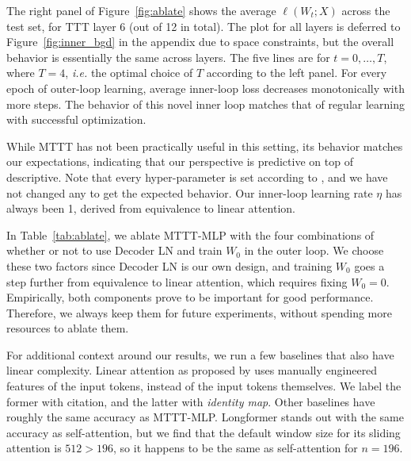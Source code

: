 \documentclass{article} %
\begin{document}
The right panel of Figure~\ref{fig:ablate} shows the average $\ell(W_t; X)$ across the test set, for TTT layer 6 (out of 12 in total).
The plot for all layers is deferred to Figure~\ref{fig:inner_bgd} in the appendix due to space constraints, but the overall behavior is essentially the same across layers.
The five lines are for $t=0,\dots,T$, where $T=4$, \textit{i.e.} the optimal choice of $T$ according to the left panel.
For every epoch of outer-loop learning, average inner-loop loss decreases monotonically with more steps.
The behavior of this novel inner loop matches that of regular learning with successful optimization.

While MTTT has not been practically useful in this setting, its behavior matches our expectations, indicating that our perspective is predictive on top of descriptive. 
Note that every hyper-parameter is set according to \cite{beyer2022better}, and we have not changed any to get the expected behavior.
Our inner-loop learning rate $\eta$ has always been 1, derived from equivalence to linear attention.

In Table~\ref{tab:ablate}, we ablate MTTT-MLP with the four combinations of whether or not to use Decoder LN and train $W_0$ in the outer loop.
We choose these two factors since Decoder LN is our own design, and training $W_0$ goes a step further from equivalence to linear attention, which requires fixing $W_0=0$.
Empirically, both components prove to be important for good performance. 
Therefore, we always keep them for future experiments, without spending more resources to ablate them.

For additional context around our results, we run a few baselines that also have linear complexity. Linear attention as proposed by \cite{katharopoulos2020transformers} uses manually engineered features of the input tokens, instead of the input tokens themselves. We label the former with citation, and the latter with \emph{identity map}. Other baselines have roughly the same accuracy as MTTT-MLP. Longformer stands out with the same accuracy as self-attention, but we find that the default window size for its sliding attention is $512 > 196$, so it happens to be the same as self-attention for $n=196$.

\end{document}

